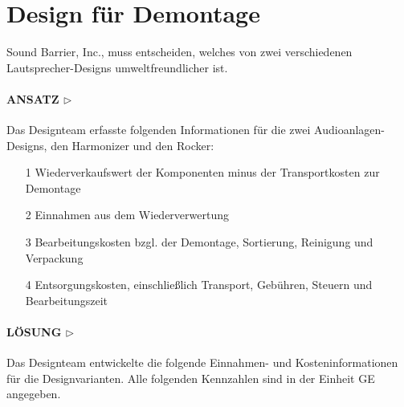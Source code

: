 \documentclass[13pt,titlepage]{article}
\begin{document}
\section*{Design für Demontage}
Sound Barrier, Inc., muss entscheiden, welches von zwei verschiedenen Lautsprecher-Designs umweltfreundlicher ist.
\paragraph{\textbf{ANSATZ} $\triangleright$ } Das Designteam erfasste folgenden Informationen für die zwei Audioanlagen-Designs, den Harmonizer und den Rocker:
\begin{itemize}
\item[1] Wiederverkaufswert der Komponenten minus der Transportkosten zur Demontage
\item[2] Einnahmen aus dem Wiederverwertung
\item[3] Bearbeitungskosten bzgl. der Demontage, Sortierung, Reinigung und Verpackung
\item[4] Entsorgungskosten, einschließlich Transport, Gebühren, Steuern und Bearbeitungszeit
\end{itemize}

\paragraph{\textbf{LÖSUNG $\triangleright$}} Das Designteam entwickelte die folgende Einnahmen- und Kosteninformationen für die Designvarianten. Alle folgenden Kennzahlen sind in der Einheit GE angegeben.
\end{document}
